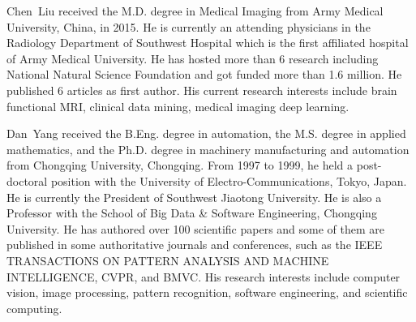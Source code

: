\documentclass[journal]{IEEEtran}
\begin{document}
\vspace{-0.5cm}
\begin{IEEEbiography}{Chen~Liu}
    received the M.D. degree in Medical Imaging from Army Medical University, China, in 2015. He is currently an attending physicians in the Radiology Department of Southwest Hospital which is the first affiliated hospital of Army Medical University. He has hosted more than 6 research including National Natural Science Foundation and got funded more than 1.6 million. He published 6 articles as first author. His current research interests include brain functional MRI, clinical data mining, medical imaging deep learning.
\end{IEEEbiography}




\vspace{-0.5cm}

\begin{IEEEbiography}{Dan~Yang}
    received the B.Eng. degree in automation, the M.S. degree in applied mathematics, and the Ph.D. degree in machinery manufacturing and automation from Chongqing University, Chongqing. From 1997 to 1999, he held a post-doctoral position with the University of Electro-Communications, Tokyo, Japan. He is currently the President of Southwest Jiaotong University. He is also a Professor with the School of Big Data \& Software Engineering, Chongqing University. He has authored over 100 scientific papers and some of them are published in some authoritative journals and conferences, such as the IEEE TRANSACTIONS ON PATTERN ANALYSIS AND MACHINE INTELLIGENCE, CVPR, and BMVC. His research interests include computer vision, image processing, pattern recognition, software engineering,
and scientific computing.
\end{IEEEbiography}
\vspace{-0.5cm}
\end{document}
